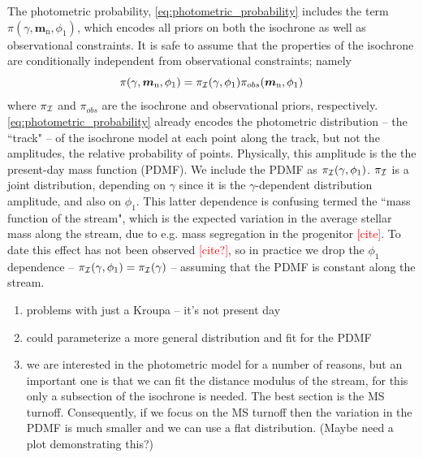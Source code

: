 \documentclass[twocolumn]{aastex631}
\newcommand{\mrm}[1]{\mathrm{#1}}
\newcommand{\mbs}[1]{\boldsymbol{#1}}
\newcommand{\mcal}[1]{\mathcal{#1}}
\newcommand{\prior}{\mcal{\pi}}
\newcommand{\nth}[1]{{#1}_{\mrm{n}}}  %
\newcommand{\TODO}[1]{{\textcolor{red}{#1}}}
\begin{document}
            The photometric probability, \autoref{eq:photometric_probability} includes the term $\prior(\gamma, \nth{\mbs{m}}, \phi_1)$, which encodes all priors on both the isochrone as well as observational constraints. It is safe to assume that the properties of the isochrone are conditionally independent from observational constraints; namely
            \begin{equation} \label{eq:isochrone_prior_components}
                \prior(\gamma, \nth{\mbs{m}}, \phi_1) = \prior_{\cal{I}}(\gamma, \phi_1) \prior_{obs}(\nth{\mbs{m}}, \phi_1)
            \end{equation}
            where $\prior_{\cal{I}}$ and $\prior_{obs}$ are the isochrone and observational priors, respectively.
            \autoref{eq:photometric_probability} already encodes the photometric distribution -- the ``track" -- of the isochrone model at each point along the track, but not the amplitudes, the relative probability of points. Physically, this amplitude is the the present-day mass function (PDMF). We include the PDMF as $\prior_{\cal{I}}(\gamma, \phi_1)$. $\prior_{\cal{I}}$ is a joint distribution, depending on $\gamma$ since it is the $\gamma$-dependent distribution amplitude, and also on $\phi_1$. This latter dependence is confusing termed the ``mass function of the stream", which is the expected variation in the average stellar mass along the stream, due to e.g. mass segregation in the progenitor \TODO{[cite]}. To date this effect has not been observed \TODO{[cite?]}, so in practice we drop the $\phi_1$ dependence -- $\prior_{\cal{I}}(\gamma, \phi_1) = \prior_{\cal{I}}(\gamma)$ -- assuming that the PDMF is constant along the stream.

            \begin{enumerate}
                \item problems with just a Kroupa -- it's not present day
                \item could parameterize a more general distribution and fit for the PDMF
                \item we are interested in the photometric model for a number of reasons, but an important one is that we can fit the distance modulus of the stream, for this only a subsection of the isochrone is needed. The best section is the MS turnoff.
                Consequently, if we focus on the MS turnoff then the variation in the PDMF is much smaller and we can use a flat distribution. (Maybe need a plot demonstrating this?)
            \end{enumerate}
\end{document}
